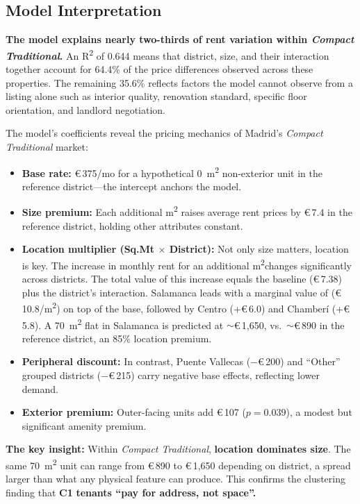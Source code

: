 \documentclass[10pt,a4paper,twocolumn]{article}
\newcommand{\cluster}[1]{\textbf{C#1}}
\newcommand{\eur}[1]{€\,#1}
\newcommand{\sqm}{m\textsuperscript{2}}
\newcommand{\seg}[1]{\textit{#1}}          %
\begin{document}
\subsection{Model Interpretation}
\textbf{The model explains nearly two-thirds of rent variation within \seg{Compact Traditional}.} An R\textsuperscript{2} of 0.644 means that district, size, and their interaction together account for 64.4\% of the price differences observed across these properties. The remaining 35.6\% reflects factors the model cannot observe from a listing alone such as interior quality, renovation standard, specific floor orientation, and landlord negotiation.

The model's coefficients reveal the pricing mechanics of Madrid's \seg{Compact Traditional} market:

\begin{itemize}
\item \textbf{Base rate:} \eur{375}/mo for a hypothetical 0~\sqm{} non-exterior unit in the reference district---the intercept anchors the model.
\item \textbf{Size premium:} Each additional \sqm{} raises average rent prices by \eur{7.4} in the reference district, holding other attributes constant.  
\item \textbf{Location multiplier (Sq.Mt $\times$ District):} Not only size matters, location is key. The increase in monthly rent for an additional \sqm changes significantly across districts. The total value of this increase equals the baseline (\eur{7.38}) plus the district's interaction. Salamanca leads with a marginal value of (\eur{10.8}/\sqm{}) on top of the base, followed by Centro (+\eur{6.0}) and Chamber\'i (+\eur{5.8}). A 70~\sqm{} flat in Salamanca is predicted at $\sim$\eur{1,650}, vs.\ $\sim$\eur{890} in the reference district, an 85\% location premium.
\item \textbf{Peripheral discount:} In contrast, Puente Vallecas ($-$\eur{200}) and ``Other'' grouped districts ($-$\eur{215}) carry negative base effects, reflecting lower demand.
\item \textbf{Exterior premium:} Outer-facing units add \eur{107} ($p\!=\!0.039$), a modest but significant amenity premium.
\end{itemize}

\textbf{The key insight:} Within \seg{Compact Traditional}, \textbf{location dominates size}. The same 70~\sqm{} unit can range from \eur{890} to \eur{1,650} depending on district, a spread larger than what any physical feature can produce. This confirms the clustering finding that \cluster{1} \textbf{tenants ``pay for address, not space''.}
\end{document}
